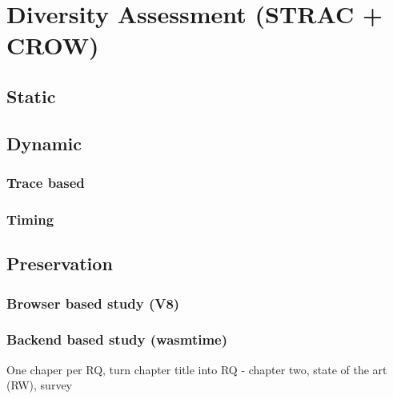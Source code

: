 \chapter{Diversity Assessment (STRAC + CROW)} 

\section{Static}

\section{Dynamic}
	\subsection{Trace based}
	\subsection{Timing}

\section{Preservation}
\subsection{Browser based study (V8)}
\subsection{Backend based study (wasmtime)}


One chaper per RQ, turn chapter title into RQ
- chapter two, state of the art (RW), survey